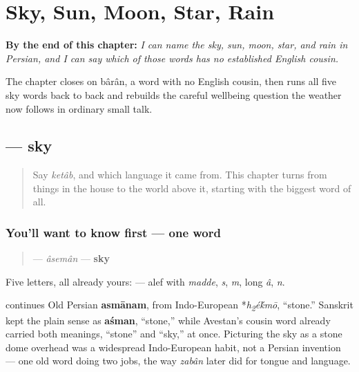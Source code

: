 
\chapter{Sky, Sun, Moon, Star, Rain}
\label{ch:fa-sky-words}

\begin{chapteropening}
\textbf{By the end of this chapter:} \emph{I can name the sky, sun, moon, star, and rain in Persian, and I can say which of those words has no established English cousin.}

The chapter closes on bârân, a word with no English cousin, then runs all five sky words back to back and rebuilds the careful wellbeing question the weather now follows in ordinary small talk.
\end{chapteropening}

\section[\texorpdfstring{\fa{آسمان} (âsemân)}{آسمان (âsemân)}]{ — sky}

\label{lesson:FA-C13-aseman}



\begin{quote}
Say \emph{ketâb}, and which language it came from. This chapter turns from things in the house to the world above it, starting with the biggest word of all.
\end{quote}

\subsection*{You'll want to know first — one word}
\begin{quote}
\textbf{} — \emph{âsemân} — \textbf{sky}
\end{quote}

Five letters, all already yours: \textbf{    } — alef with \emph{madde}, \emph{s}, \emph{m}, long \emph{â}, \emph{n}.

\begin{cousinweb}
\textbf{} continues Old Persian \textbf{asmānam}, from Indo-European *\emph{h\textsubscript{2}é\'{k}mō}, \textquotedblleft{}stone.\textquotedblright{} Sanskrit kept the plain sense as \textbf{aśman}, \textquotedblleft{}stone,\textquotedblright{} while Avestan's cousin word already carried both meanings, \textquotedblleft{}stone\textquotedblright{} and \textquotedblleft{}sky,\textquotedblright{} at once. Picturing the sky as a stone dome overhead was a widespread Indo-European habit, not a Persian invention — one old word doing two jobs, the way \emph{zabân} later did for tongue and language.
\end{cousinweb}

